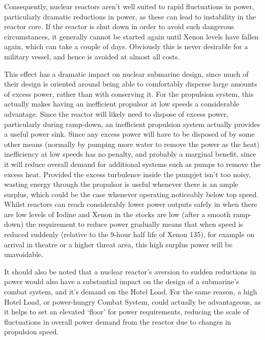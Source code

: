 \documentclass{article}\usepackage[]{graphicx}\usepackage[]{color}
\begin{document}
Consequently, nuclear reactors aren't well suited to rapid fluctuations in power, particularly dramatic reductions in power, as these can lead to instability in the reactor core.  If the reactor is shut down in order to avoid such dangerous circumstances, it generally cannot be started again until Xenon levels have fallen again, which can take a couple of days.  Obviously this is never desirable for a military vessel, and hence is avoided at almost all costs.

This effect has a dramatic impact on nuclear submarine design, since much of their design is oriented around being able to comfortably disperse large amounts of excess power, rather than with conserving it.  For the propulsion system, this actually makes having an inefficient propulsor at low speeds a considerable advantage.  Since the reactor will likely need to dispose of excess power, particularly during ramp-down, an inefficient propulsion system actually provides a useful power sink.  Since any excess power will have to be disposed of by some other means (normally by pumping more water to remove the power as the heat) inefficiency at low speeds has no penalty, and probably a marginal benefit, since it will reduce overall demand for additional systems such as pumps to remove the excess heat.  Provided the excess turbulence inside the pumpjet isn't too noisy, wasting energy through the propulsor is useful whenever there is an ample surplus, which could be the case whenever operating noticeably below top speed. Whilst reactors can reach considerably lower power outputs safely in when there are low levels of Iodine and Xenon in the stocks are low (after a smooth ramp-down) the requirement to reduce power gradually means that when speed is reduced suddenly (relative to the 9-hour half life of Xenon 135), for example on arrival in theatre or a higher threat area, this high surplus power will be unavoidable.

It should also be noted that a nuclear reactor's aversion to sudden reductions in power would also have a substantial impact on the design of a submarine's combat system, and it's demand on the Hotel Load. For the same reason, a high Hotel Load, or power-hungry Combat System, could actually be advantageous, as it helps to set an elevated `floor' for power requirements, reducing the scale of fluctuations in overall power demand from the reactor due to changes in propulsion speed.
\end{document}
